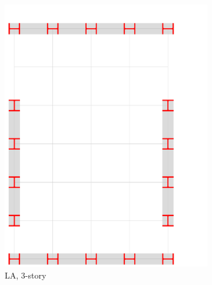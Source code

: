 \documentclass{simcenterdocumentation}
\begin{document}
\begin{figure}[H]
\begin{subfigure}[b]{0.24\linewidth}
		\centering \includegraphics[page=3,trim=0mm 0mm 32mm 17mm,clip,scale=0.2]{moment_frames.pdf}
		\caption{LA, 3-story}
	\end{subfigure}
	\begin{subfigure}[b]{0.24\linewidth}

\end{subfigure}
\end{figure}
\end{document}
